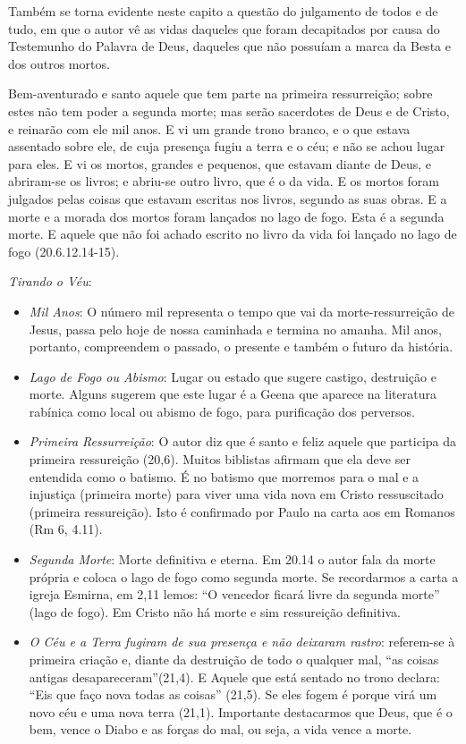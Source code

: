 \documentclass[
]{book}
\begin{document}
Também se torna evidente neste capito a questão do julgamento de todos e de tudo, em que o autor vê as vidas daqueles que foram decapitados por causa do Testemunho do Palavra de Deus, daqueles que não possuíam a marca da Besta e dos outros mortos.

Bem-aventurado e santo aquele que tem parte na primeira ressurreição; sobre estes não tem poder a segunda morte; mas serão sacerdotes de Deus e de Cristo, e reinarão com ele mil anos. E vi um grande trono branco, e o que estava assentado sobre ele, de cuja presença fugiu a terra e o céu; e não se achou lugar para eles. E vi os mortos, grandes e pequenos, que estavam diante de Deus, e abriram-se os livros; e abriu-se outro livro, que é o da vida. E os mortos foram julgados pelas coisas que estavam escritas nos livros, segundo as suas obras. E a morte e a morada dos mortos foram lançados no lago de fogo. Esta é a segunda morte. E aquele que não foi achado escrito no livro da vida foi lançado no lago de fogo (20.6.12.14-15).

\emph{Tirando o Véu}:

\begin{itemize}
\item
  \emph{Mil Anos}: O número mil representa o tempo que vai da morte-ressurreição de Jesus, passa pelo hoje de nossa caminhada e termina no amanha. Mil anos, portanto, compreendem o passado, o presente e também o futuro da história.
\item
  \emph{Lago de Fogo ou Abismo}: Lugar ou estado que sugere castigo, destruição e morte. Alguns sugerem que este lugar é a Geena que aparece na literatura rabínica como local ou abismo de fogo, para purificação dos perversos.
\item
  \emph{Primeira Ressurreição}: O autor diz que é santo e feliz aquele que participa da primeira ressureição (20,6). Muitos biblistas afirmam que ela deve ser entendida como o batismo. É no batismo que morremos para o mal e a injustiça (primeira morte) para viver uma vida nova em Cristo ressuscitado (primeira ressureição). Isto é confirmado por Paulo na carta aos em Romanos (Rm 6, 4.11).
\item
  \emph{Segunda Morte}: Morte definitiva e eterna. Em 20.14 o autor fala da morte própria e coloca o lago de fogo como segunda morte. Se recordarmos a carta a igreja Esmirna, em 2,11 lemos: ``O vencedor ficará livre da segunda morte'' (lago de fogo). Em Cristo não há morte e sim ressureição definitiva.
\item
  \emph{O Céu e a Terra fugiram de sua presença e não deixaram rastro}: referem-se à primeira criação e, diante da destruição de todo o qualquer mal, ``as coisas antigas desapareceram''(21,4). E Aquele que está sentado no trono declara: ``Eis que faço nova todas as coisas'' (21,5). Se eles fogem é porque virá um novo céu e uma nova terra (21,1). Importante destacarmos que Deus, que é o bem, vence o Diabo e as forças do mal, ou seja, a vida vence a morte.
\end{itemize}
\end{document}
